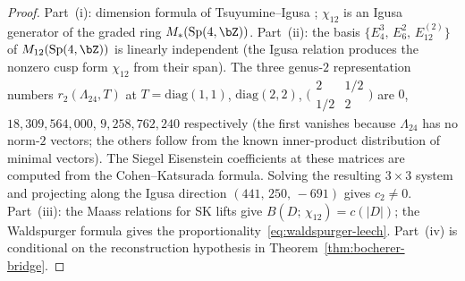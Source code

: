 \begin{proof}
Part~(i): dimension formula of Tsuyumine--Igusa
\cite{DPSS20};
$\chi_{12}$ is an Igusa generator of the graded ring
$M_*(\mathrm{Sp}(4,\bZ))$.
Part~(ii): the basis
$\{E_4^3,\, E_6^2,\, E_{12}^{(2)}\}$ of
$M_{12}(\mathrm{Sp}(4,\bZ))$ is linearly independent
(the Igusa relation produces the nonzero cusp form
$\chi_{12}$ from their span).
The three genus-$2$ representation numbers
$r_2(\Lambda_{24}, T)$ at $T = \mathrm{diag}(1,1)$,
$\mathrm{diag}(2,2)$,
$\bigl(\begin{smallmatrix}2 & 1/2 \\ 1/2 & 2\end{smallmatrix}\bigr)$
are
$0$, $18{,}309{,}564{,}000$, $9{,}258{,}762{,}240$
respectively
(the first vanishes because $\Lambda_{24}$ has no
norm-$2$ vectors; the others follow from the known
inner-product distribution of minimal vectors).
The Siegel Eisenstein coefficients at these matrices are
computed from the Cohen--Katsurada formula.
Solving the resulting $3 \times 3$ system and projecting along
the Igusa direction $(441,\, 250,\, -691)$ gives
$c_2 \neq 0$.
Part~(iii): the Maass relations for SK lifts give
$B(D;\, \chi_{12}) = c(\lvert D\rvert)$; the Waldspurger
formula \cite{Waldspurger81} gives the
proportionality~\eqref{eq:waldspurger-leech}.
Part~(iv) is conditional on the reconstruction hypothesis in
Theorem~\ref{thm:bocherer-bridge}.
\end{proof}

